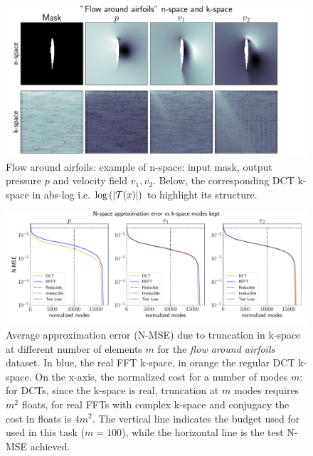 \begin{figure}[h!]
    \centering
    \includegraphics[width=0.75\linewidth]{figures/dfp_kspace.pdf}
    \vspace{-3mm}
    \caption{\small Flow around airfoils: example of n-space: input mask, output pressure $p$ and velocity field $v_1, v_2$. Below, the corresponding DCT k-space in abs-log i.e. $\log{(|\mathcal{T}(x)|)}$ to highlight its structure.}
    \label{fig:dfp-nspace-kspace}
\end{figure}

\begin{figure}[h!]
    \centering
    \includegraphics[width=1\linewidth]{figures/dfp_spectrum_approx.pdf}
    \vspace{-8mm}
    \caption{\small Average approximation error (N-MSE) due to truncation in k-space at different number of elements $m$ for the \textit{flow around airfoils} dataset. In blue, the real FFT k-space, in orange the regular DCT k-space. On the x-axis, the normalized cost for a number of modes $m$: for DCTs, since the k-space is real, truncation at $m$ modes requires $m^2$ floats, for real FFTs with complex k-space and conjugacy the cost in floats is $4m^2$. The vertical line indicates the budget used for \ourmethod{} used in this task ($m=100$), while the horizontal line is the test N-MSE achieved.} 
    \label{fig:dfp-approx-decay}
    
\end{figure}



